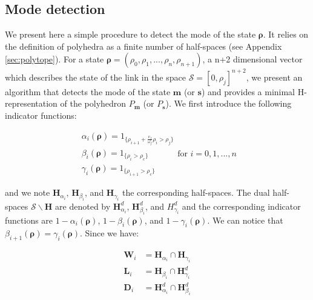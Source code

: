 \documentclass[11pt]{article}
\numberwithin{equation}{section}
\numberwithin{figure}{section}
\numberwithin{table}{section}
\begin{document}
\subsection{Mode detection}

We present here a simple procedure to detect the mode of the state $\boldsymbol\rho$. It relies on the definition of polyhedra as a finite number of half-spaces (see Appendix \ref{sec:polytope}). For a state $\boldsymbol\rho = (\rho_{0},\rho_{1},...,\rho_{n},\rho_{n+1})$, a n+2 dimensional vector which describes the state of the link in the space $\mathcal{S} = [0,\rho_{j}]^{n+2}$, we present an algorithm that detects the mode of the state $\boldsymbol m$ (or $\boldsymbol s$) and provides a minimal H-representation of the polyhedron $P_{\boldsymbol m}$ (or $P_{\boldsymbol s}$). We first introduce the following indicator functions:

\begin{equation}
\begin{array}{l}
\alpha_{i}(\boldsymbol\rho)=1_{\{\rho_{i+1} + \frac{v_{f}}{\omega_{f}}\rho_{i}>\rho_{j}\}}\\
\beta_{i}(\boldsymbol\rho)=1_{\{\rho_{i}>\rho_{c}\}}\\
\gamma_{i}(\boldsymbol\rho)=1_{\{\rho_{i+1}>\rho_{c}\}}
\end{array}
\text{for }i=0,1,...,n
\label{eq:indicators}
\end{equation}

\noindent and we note $\textbf{H}_{\alpha_{i}}$, $\textbf{H}_{\beta_{i}}$, and $\textbf{H}_{\gamma_{i}}$ the corresponding half-spaces. The dual half-spaces $\mathcal{S}\backslash \textbf{H}$ are denoted by $\textbf{H}^{d}_{\alpha_{i}}$, $\textbf{H}^{d}_{\beta_{i}}$, and $H^{d}_{\gamma_{i}}$ and the corresponding indicator functions are $1-\alpha_{i}(\boldsymbol\rho)$, $1-\beta_{i}(\boldsymbol\rho)$, and $1-\gamma_{i}(\boldsymbol\rho)$. We can notice that $\beta_{i+1}(\boldsymbol\rho)=\gamma_{i}(\boldsymbol\rho)$. Since we have:

\begin{equation}
\begin{array}{ll}
\textbf{W}_{i}&=\textbf{H}_{\alpha_{i}}\cap \textbf{H}_{\gamma_{i}}\\
\textbf{L}_{i}&=\textbf{H}_{\beta_{i}}\cap \textbf{H}^{d}_{\gamma_{i}}\\
\textbf{D}_{i}&=\textbf{H}^{d}_{\alpha_{i}}\cap \textbf{H}^{d}_{\beta_{i}}
\end{array}
\label{eq:Hrepresentation3}
\end{equation}
\end{document}
